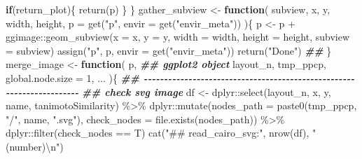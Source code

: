 \documentclass[
]{article}
\newenvironment{Shaded}{\begin{snugshade}}{\end{snugshade}}
\newcommand{\AttributeTok}[1]{\textcolor[rgb]{0.77,0.63,0.00}{#1}}
\newcommand{\ControlFlowTok}[1]{\textcolor[rgb]{0.13,0.29,0.53}{\textbf{#1}}}
\newcommand{\DecValTok}[1]{\textcolor[rgb]{0.00,0.00,0.81}{#1}}
\newcommand{\DocumentationTok}[1]{\textcolor[rgb]{0.56,0.35,0.01}{\textbf{\textit{#1}}}}
\newcommand{\FunctionTok}[1]{\textcolor[rgb]{0.00,0.00,0.00}{#1}}
\newcommand{\NormalTok}[1]{#1}
\newcommand{\OtherTok}[1]{\textcolor[rgb]{0.56,0.35,0.01}{#1}}
\newcommand{\SpecialCharTok}[1]{\textcolor[rgb]{0.00,0.00,0.00}{#1}}
\newcommand{\StringTok}[1]{\textcolor[rgb]{0.31,0.60,0.02}{#1}}
\begin{document}
\begin{Shaded}
\begin{Highlighting}[]
    \ControlFlowTok{if}\NormalTok{(return\_plot)\{}
      \FunctionTok{return}\NormalTok{(p)}
\NormalTok{    \}}
\NormalTok{  \}}
\NormalTok{gather\_subview }\OtherTok{\textless{}{-}}
  \ControlFlowTok{function}\NormalTok{(}
\NormalTok{           subview,}
\NormalTok{           x,}
\NormalTok{           y,}
\NormalTok{           width,}
\NormalTok{           height,}
           \AttributeTok{p =} \FunctionTok{get}\NormalTok{(}\StringTok{"p"}\NormalTok{, }\AttributeTok{envir =} \FunctionTok{get}\NormalTok{(}\StringTok{"envir\_meta"}\NormalTok{))}
\NormalTok{           )\{}
\NormalTok{    p }\OtherTok{\textless{}{-}}\NormalTok{ p }\SpecialCharTok{+}\NormalTok{ ggimage}\SpecialCharTok{::}\FunctionTok{geom\_subview}\NormalTok{(}\AttributeTok{x =}\NormalTok{ x, }\AttributeTok{y =}\NormalTok{ y, }\AttributeTok{width =}\NormalTok{ width, }\AttributeTok{height =}\NormalTok{ height,}
                          \AttributeTok{subview =}\NormalTok{ subview)}
    \FunctionTok{assign}\NormalTok{(}\StringTok{"p"}\NormalTok{, p, }\AttributeTok{envir =} \FunctionTok{get}\NormalTok{(}\StringTok{"envir\_meta"}\NormalTok{))}
    \FunctionTok{return}\NormalTok{(}\StringTok{"Done"}\NormalTok{)}
    \DocumentationTok{\#\#}
\NormalTok{  \}}
\NormalTok{merge\_image }\OtherTok{\textless{}{-}}
  \ControlFlowTok{function}\NormalTok{(}
\NormalTok{           p, }\DocumentationTok{\#\# ggplot2 object}
\NormalTok{           layout\_n,}
\NormalTok{           tmp\_ppcp,}
           \AttributeTok{global.node.size =} \DecValTok{1}\NormalTok{,}
\NormalTok{           ...}
\NormalTok{           )\{}
    \DocumentationTok{\#\# {-}{-}{-}{-}{-}{-}{-}{-}{-}{-}{-}{-}{-}{-}{-}{-}{-}{-}{-}{-}{-}{-}{-}{-}{-}{-}{-}{-}{-}{-}{-}{-}{-}{-}{-}{-}{-}{-}{-}{-}{-}{-}{-}{-}{-}{-}{-}{-}{-}{-}{-}{-}{-}{-}{-}{-}{-}{-}{-}{-}{-}{-}{-}{-}{-}{-}{-}{-}{-}{-} }
    \DocumentationTok{\#\# check svg image}
\NormalTok{    df }\OtherTok{\textless{}{-}}\NormalTok{ dplyr}\SpecialCharTok{::}\FunctionTok{select}\NormalTok{(layout\_n, x, y, name, tanimotoSimilarity) }\SpecialCharTok{\%\textgreater{}\%}
\NormalTok{      dplyr}\SpecialCharTok{::}\FunctionTok{mutate}\NormalTok{(}\AttributeTok{nodes\_path =} \FunctionTok{paste0}\NormalTok{(tmp\_ppcp, }\StringTok{"/"}\NormalTok{, name, }\StringTok{".svg"}\NormalTok{),}
                    \AttributeTok{check\_nodes =} \FunctionTok{file.exists}\NormalTok{(nodes\_path)) }\SpecialCharTok{\%\textgreater{}\%}
\NormalTok{      dplyr}\SpecialCharTok{::}\FunctionTok{filter}\NormalTok{(check\_nodes }\SpecialCharTok{==}\NormalTok{ T)}
    \FunctionTok{cat}\NormalTok{(}\StringTok{"\#\# read\_cairo\_svg:"}\NormalTok{, }\FunctionTok{nrow}\NormalTok{(df), }\StringTok{"(number)}\SpecialCharTok{\textbackslash{}n}\StringTok{"}\NormalTok{)}

\end{Highlighting}
\end{Shaded}
\end{document}
